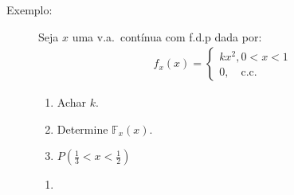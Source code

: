  \begin{description}

   \item [Exemplo:] 
     Seja $x$ uma v.a.\ contínua com f.d.p dada por:
     \begin{align*}
       f_{x}(x) = 
       \begin{cases} 
         k x^2, 0 < x < 1 \\
         0, \quad \text{c.c.\ }
       \end{cases}
     \end{align*}
     \begin{enumerate}[label=(\alph*)]
       \item Achar $k$.
       \item Determine $\mathbb{F}_{x} (x)$.
       \item $P (\frac{1}{3} < x < \frac{1}{2})$
     \end{enumerate} 

     \begin{enumerate}[label=(\alph*)]
       \item 


\end{enumerate}
\end{description}
